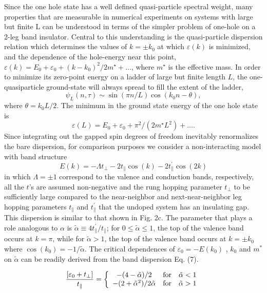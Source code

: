 \documentclass[aps,prb,twocolumn]{revtex4}
\def\be{\begin{equation}}       \def\ee{\end{equation}}
\begin{document}
Since the one hole state has a well defined quasi-particle spectral weight, 
many properties that are measurable in numerical experiments on systems 
with large but finite L can be understood in terms of the simpler problem of
 one-hole on a 2-leg band insulator.
   Central to this understanding is the quasi-particle dispersion relation
which determines  the values of $k=\pm
k_0$  at which $\varepsilon(k)$ is minimized, and the dependence of the hole-energy near this point,
$\varepsilon(k) =E_0+\varepsilon_0 +
(k-k_0)^2/2m^\star +\ldots$, where $m^\star$ is the effective mass. 
In order to minimize its zero-point energy 
on a ladder of large but finite
length $L$, the one-quasiparticle ground-state will always spread to fill the
extent of the ladder,
\be
\psi_L(n,\tau) \sim \sin(\pi n/L) \cos(k_0n-\theta),
\ee
where $\theta=k_0L/2$.  The minimum in the  ground state energy of the one hole state is 
\be
\varepsilon(L) =E_0+ \varepsilon_0 + \pi^2/(2m^\star L^2) + \ldots .
\label{box}
\ee 
Since integrating out the gapped spin degrees of freedom 
inevitably renormalizes the bare dispersion, for comparison purposes we consider a non-interacting model with  
band structure
\be
E(k) = - \Lambda t_\perp -2t_\parallel\cos(k) - 2t_\parallel^\prime \cos(2k)
\ee
 in which $\Lambda=\pm 1$ correspond to the valence and conduction bands, respectively, all the $t$'s are assumed non-negative and
   the rung hopping parameter $t_\perp$ 
   to be sufficiently large compared to the near-neighbor and
next-near-neighbor leg hopping parameters $t_\parallel $ and
$t_\parallel^\prime $ that the undoped system has an insulating gap.  This
dispersion is similar to that shown in Fig. 2c. The parameter that plays a role
analogous to $\alpha$ is $\tilde \alpha \equiv 4 t_\parallel^\prime/t_\parallel$;  for $0\leq \tilde \alpha \leq 1$,
 the top of
the valence band occurs at $k=\pi$, while for $\tilde \alpha > 1$, the top of
the valence band occurs at $k=\pm k_0$ where $\cos(k_0) = -1/\tilde \alpha$.
The critical dependences of $ \varepsilon_0=-E(k_0)$ , $k_0$ and $m^{*} $ on $ \tilde\alpha $
can be readily derived from the band dispersion Eq. (7). 

\be
\frac {[\varepsilon_0 + t_\perp]} {t_\parallel} =
\left\{
\begin{array}{ccc}
 -{(4-\tilde \alpha)}/{2} &  {\rm for}  & \tilde \alpha< 1  \\
 -{(2+\tilde \alpha^2)}/{2\tilde \alpha}
& {\rm for}   &   \tilde \alpha > 1
\end{array}
\right. 
\ee
\end{document}
